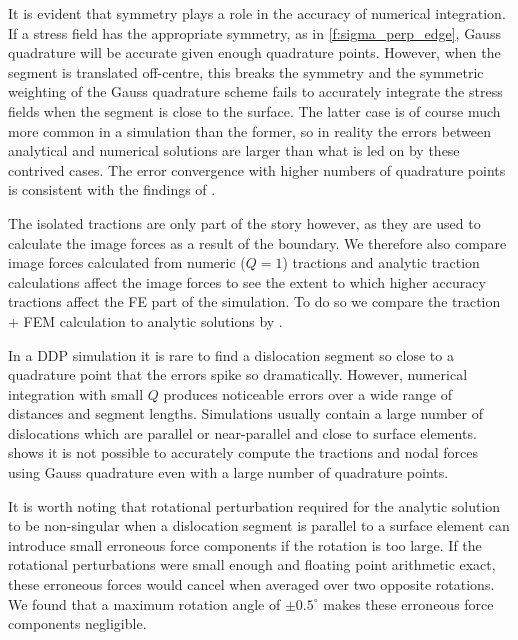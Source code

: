 \documentclass[11pt]{iopart}
\begin{document}
It is evident that symmetry plays a role in the accuracy of numerical integration. If a stress field has the appropriate symmetry, as in \cref{f:sigma_perp_edge}, Gauss quadrature will be accurate given enough quadrature points. However, when the segment is translated off-centre, this breaks the symmetry and the symmetric weighting of the Gauss quadrature scheme fails to accurately integrate the stress fields when the segment is close to the surface. The latter case is of course much more common in a simulation than the former, so in reality the errors between analytical and numerical solutions are larger than what is led on by these contrived cases. The error convergence with higher numbers of quadrature points is consistent with the findings of \cite{Queyreau}.

The isolated tractions are only part of the story however, as they are used to calculate the image forces as a result of the boundary. We therefore also compare image forces calculated from numeric ($Q = 1$) tractions and analytic traction calculations affect the image forces to see the extent to which higher accuracy tractions affect the FE part of the simulation. To do so we compare the traction + FEM calculation to analytic solutions by \citet{Head}.

In a DDP simulation it is rare to find a dislocation segment so close to a quadrature point that the errors spike so dramatically. However, numerical integration with small $Q$ produces noticeable errors over a wide range of distances and segment lengths. Simulations usually contain a large number of dislocations which are parallel or near-parallel and close to surface elements.  shows it is not possible to accurately compute the tractions and nodal forces using Gauss quadrature even with a large number of quadrature points.

It is worth noting that rotational perturbation required for the analytic solution to be non-singular when a dislocation segment is parallel to a surface element can introduce small erroneous force components if the rotation is too large. If the rotational perturbations were small enough and floating point arithmetic exact, these erroneous forces would cancel when averaged over two opposite rotations. We found that a maximum rotation angle of $\pm0.5^\circ$ makes these erroneous force components negligible.
\end{document}
